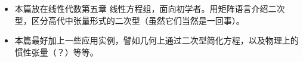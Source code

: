 

\begin{issues}
\issueTODO 
\begin{itemize}
\item 本篇放在线性代数第五章 线性方程组，面向初学者。用矩阵语言介绍二次型，区分高代中张量形式的二次型（虽然它们当然是一回事）。
\item  本篇最好加上一些应用实例，譬如几何上通过二次型简化方程，以及物理上的惯性张量（？）等等。
\end{itemize}
\end{issues}

